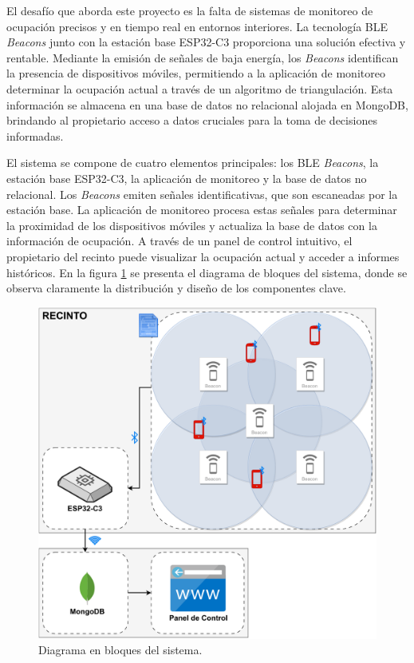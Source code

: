 \documentclass[
11pt, %
]{charter}
\begin{document}
El desafío que aborda este proyecto es la falta de sistemas de monitoreo de ocupación precisos y en tiempo real en entornos interiores. La tecnología BLE \textit{Beacons} junto con la estación base ESP32-C3 proporciona una solución efectiva y rentable. Mediante la emisión de señales de baja energía, los \textit{Beacons} identifican la presencia de dispositivos móviles, permitiendo a la aplicación de monitoreo determinar la ocupación actual a través de un algoritmo de triangulación. Esta información se almacena en una base de datos no relacional alojada en MongoDB, brindando al propietario acceso a datos cruciales para la toma de decisiones informadas.

El sistema se compone de cuatro elementos principales: los BLE \textit{Beacons}, la estación base ESP32-C3, la aplicación de monitoreo y la base de datos no relacional. Los \textit{Beacons} emiten señales identificativas, que son escaneadas por la estación base. La aplicación de monitoreo procesa estas señales para determinar la proximidad de los dispositivos móviles y actualiza la base de datos con la información de ocupación. A través de un panel de control intuitivo, el propietario del recinto puede visualizar la ocupación actual y acceder a informes históricos. En la figura \ref{fig:diagBloques} se presenta el diagrama de bloques del sistema, donde se observa claramente la distribución y diseño de los componentes clave.

\begin{figure}[htpb]
\centering 
\includegraphics[width=.7\textwidth]{./Figuras/diagBloques.pdf}
\caption{Diagrama en bloques del sistema.}
\label{fig:diagBloques}
\end{figure}
\end{document}
